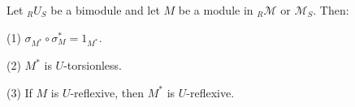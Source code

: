 Let ${}_R U_S$ be a bimodule and let $M$ be a module in ${}_R\mathcal{M}$ or $\mathcal{M}_S$. Then:

(1) $\sigma_{M^*} \circ \sigma_M^* = 1_{M^*}$.

(2) $M^*$ is $U$-torsionless.

(3) If $M$ is $U$-reflexive, then $M^*$ is $U$-reflexive.
